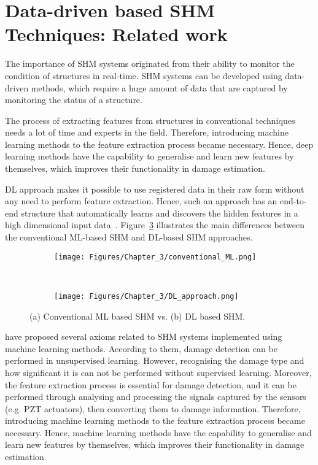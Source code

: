 \section{Data-driven based SHM Techniques: Related work}
\label{sec33}
The importance of SHM systems originated from their ability to monitor the condition of structures in real-time.
SHM systems can be developed using data-driven methods, which require a huge amount of data that are captured by monitoring the status of a structure.

The process of extracting features from structures in conventional techniques needs a lot of time and experts in the field. 
Therefore, introducing machine learning methods to the feature extraction process became necessary.
Hence, deep learning methods have the capability to generalise and learn new features by themselves, which improves their functionality in damage estimation.

DL approach makes it possible to use registered data in their raw form without any need to perform feature extraction.
Hence, such an approach has an end-to-end structure that automatically learns and discovers the hidden features in a high dimensional input data~\cite{LeCun, Networks}.
Figure~\ref{fig:ML_vs_DL} illustrates the main differences between the conventional ML-based SHM and DL-based SHM approaches.

\begin{figure}[!ht]
	\centering
	\begin{subfigure}{1\textwidth}		
		\centering
		\texttt{[image: Figures/Chapter\_3/conventional\_ML.png]}
		\caption{} 
		\label{fig:ML_conventional}
	\end{subfigure}
	\\
	\begin{subfigure}{1\textwidth}
		\centering
		\texttt{[image: Figures/Chapter\_3/DL\_approach.png]}
		\caption{} 
		\label{fig:DL_approach}
	\end{subfigure}	
	\caption{(a) Conventional ML based SHM vs. (b) DL based SHM.}
	\label{fig:ML_vs_DL}
\end{figure}
\textcite{Worden2007} have proposed several axioms related to SHM systems implemented using machine learning methods. 
According to them, damage detection can be performed in unsupervised learning.
However, recognising the damage type and how significant it is can not be performed without supervised learning. 
Moreover, the feature extraction process is essential for damage detection, and it can be performed through analysing and processing the signals captured by the sensors (e.g. PZT actuators), then converting them to damage information.
Therefore, introducing machine learning methods to the feature extraction process became necessary.
Hence, machine learning methods have the capability to generalise and learn new features by themselves, which improves their functionality in damage estimation.

